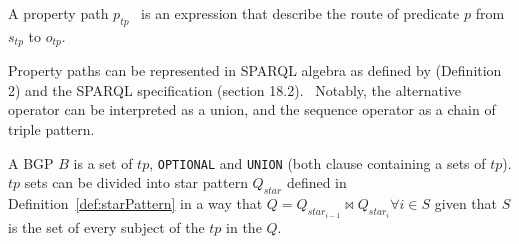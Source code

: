 \begin{definition}\label{def:propertyPath}
   A property path $p_{tp}$~\cite{Kostylev2015} is an expression that describe the route of predicate $p$ from $s_{tp}$ to $o_{tp}$.
   \iffalse
   A property path in $tp$ is defined as follow:
   \begin{equation}
    p_{tp} ::= p \in \mathcal{I} | (p_{tpi}/p_{tpj}) | (p_{tpi}|p_{tpj}) | p_{tpi}* | p_{tpi}+ | p_{tpi}? | !p_{tpi}| p_{tpi}^{-}
   \end{equation}.
   The "$/$" operator chain two property path, the alternative operator "$|$" define a possibility between $p_{tpi}$ and $p_{tpj}$.
   The "$^-$" operator inverse the path from $s_{tp}$ to $o_{tp}$.
   The "$!$" represent the negation of a path $p_{tpi}$ such as $p_{tpi} = \mathcal{I} \setminus p_{tpi}$.
   The "$*$", "$+$" and "$?$", refered to in this paper as \emph{cardinality property paths}, are respectively; the repetition of 0 and more of $p_{tpi}$, 
   the repetition of 1 and more of $p_{tpi}$ and the presence or absence of $p_{tpi}$.
   \fi
\end{definition}

Property paths can be represented in SPARQL algebra as defined by \citeauthor{Kostylev2015} (Definition 2) and the SPARQL specification (section 18.2).~
Notably, the alternative operator can be interpreted as a union, and the sequence operator as a chain of triple pattern.

\begin{definition}[BGP]\label{def:bgp}
 A BGP $B$ is a set of $tp$, \texttt{OPTIONAL} and \texttt{UNION} (both clause containing a sets of $tp$).
 $tp$ sets can be divided into star pattern $Q_{star}$ defined in Definition~\ref{def:starPattern} in a way 
 that $Q = Q_{star_{i-1}} \bowtie Q_{star_i} \forall i \in S$ given that $S$ is the set of every subject of the $tp$ in the $Q$.
\end{definition}


